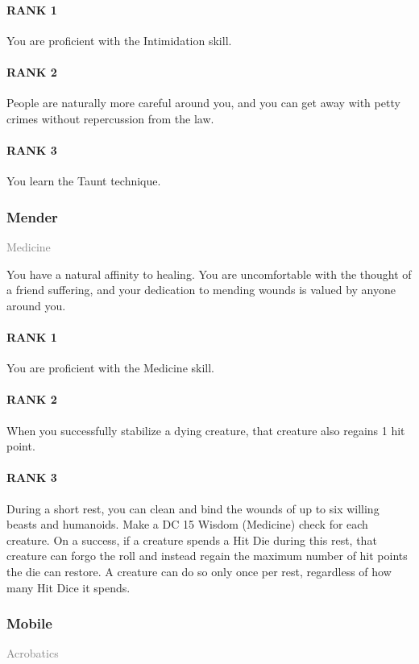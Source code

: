 \paragraph{RANK 1} You are proficient with the Intimidation skill.
\paragraph{RANK 2} People are naturally more careful around you, and you can get away with petty crimes without repercussion from the law.
\paragraph{RANK 3} You learn the Taunt technique.

\subsubsection{Mender} \label{feat::mender}
\small{\textcolor{gray}{Medicine}}

\normalsize
You have a natural affinity to healing.
You are uncomfortable with the thought of a friend suffering, and your dedication to mending wounds is valued by anyone around you.
\paragraph{RANK 1} You are proficient with the Medicine skill.
\paragraph{RANK 2} When you successfully stabilize a dying creature, that creature also regains 1 hit point.
\paragraph{RANK 3} During a short rest, you can clean and bind the wounds of up to six willing beasts and humanoids.
Make a DC 15 Wisdom (Medicine) check for each creature.
On a success, if a creature spends a Hit Die during this rest, that creature can forgo the roll and instead regain the maximum number of hit points the die can restore.
A creature can do so only once per rest, regardless of how many Hit Dice it spends.

\subsubsection{Mobile} \label{feat::mobile}
\small{\textcolor{gray}{Acrobatics}}

